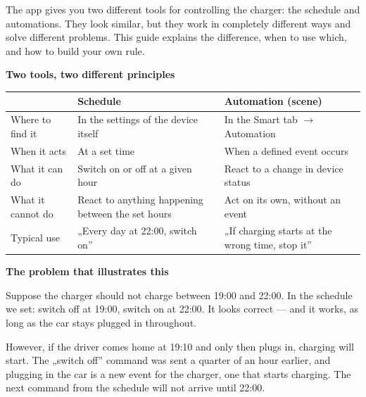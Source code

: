 \documentclass[11pt]{article}
\begin{document}

{\large\color{apink} The app gives you two different tools for controlling the charger: the schedule and automations. They look similar, but they work in completely different ways and solve different problems. This guide explains the difference, when to use which, and how to build your own rule.}

\vspace{0.35cm}
{\bfseries\color{apnavy}\large Two tools, two different principles}

\vspace{0.2cm}
\begin{tabularx}{\textwidth}{@{}p{3.4cm}XX@{}}
\toprule
 & \textbf{\color{apnavy}Schedule} & \textbf{\color{apnavy}Automation (scene)}\\
\midrule
Where to find it & In the settings of the device itself & In the Smart tab $\rightarrow$ Automation\\
When it acts & At a set time & When a defined event occurs\\
What it can do & Switch on or off at a given hour & React to a change in device status\\
What it cannot do & React to anything happening between the set hours & Act on its own, without an event\\
Typical use & „Every day at 22:00, switch on” & „If charging starts at the wrong time, stop it”\\
\bottomrule
\end{tabularx}


\vspace{0.35cm}
{\bfseries\color{apnavy}\large The problem that illustrates this}

Suppose the charger should not charge between 19:00 and 22:00. In the schedule we set: switch off at 19:00, switch on at 22:00. It looks correct — and it works, as long as the car stays plugged in throughout.

However, if the driver comes home at 19:10 and only then plugs in, charging will start. The „switch off” command was sent a quarter of an hour earlier, and plugging in the car is a new event for the charger, one that starts charging. The next command from the schedule will not arrive until 22:00.
\end{document}
